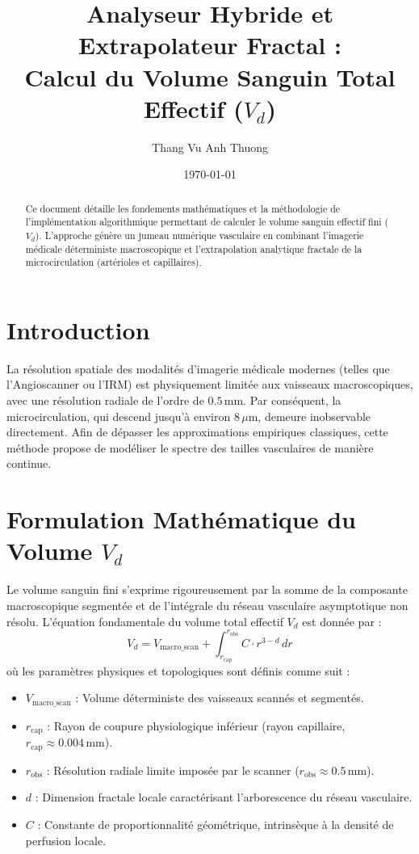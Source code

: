 \documentclass[11pt,a4paper]{article}
\title{\textbf{Analyseur Hybride et Extrapolateur Fractal : \\ Calcul du Volume Sanguin Total Effectif ($V_d$)}}
\author{Thang Vu Anh Thuong}
\date{\today}
\begin{document}
\maketitle

\begin{abstract}
Ce document détaille les fondements mathématiques et la méthodologie de l'implémentation algorithmique permettant de calculer le volume sanguin effectif fini ($V_d$). L'approche génère un jumeau numérique vasculaire en combinant l'imagerie médicale déterministe macroscopique et l'extrapolation analytique fractale de la microcirculation (artérioles et capillaires).
\end{abstract}

\section{Introduction}
La résolution spatiale des modalités d'imagerie médicale modernes (telles que l'Angioscanner ou l'IRM) est physiquement limitée aux vaisseaux macroscopiques, avec une résolution radiale de l'ordre de $0.5 \, \text{mm}$. Par conséquent, la microcirculation, qui descend jusqu'à environ $8 \, \mu\text{m}$, demeure inobservable directement. 
Afin de dépasser les approximations empiriques classiques, cette méthode propose de modéliser le spectre des tailles vasculaires de manière continue.

\section{Formulation Mathématique du Volume $V_d$}
Le volume sanguin fini s'exprime rigoureusement par la somme de la composante macroscopique segmentée et de l'intégrale du réseau vasculaire asymptotique non résolu. L'équation fondamentale du volume total effectif $V_d$ est donnée par :
\begin{equation}
    V_d = V_{\text{macro\_scan}} + \int_{r_{\text{cap}}}^{r_{\text{obs}}} C \cdot r^{3-d} \, dr
\end{equation}
où les paramètres physiques et topologiques sont définis comme suit :
\begin{itemize}
    \item $V_{\text{macro\_scan}}$ : Volume déterministe des vaisseaux scannés et segmentés.
    \item $r_{\text{cap}}$ : Rayon de coupure physiologique inférieur (rayon capillaire, $r_{\text{cap}} \approx 0.004 \, \text{mm}$).
    \item $r_{\text{obs}}$ : Résolution radiale limite imposée par le scanner ($r_{\text{obs}} \approx 0.5 \, \text{mm}$).
    \item $d$ : Dimension fractale locale caractérisant l'arborescence du réseau vasculaire.
    \item $C$ : Constante de proportionnalité géométrique, intrinsèque à la densité de perfusion locale.
\end{itemize}
\end{document}
